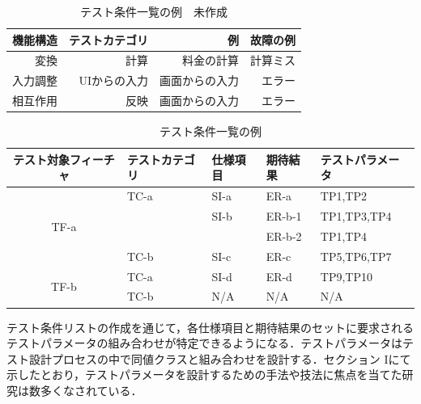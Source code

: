 \documentclass[a4paper,12pt]{jreport}
\begin{document}
\begin{table}[t]
\caption{テスト条件一覧の例　未作成}
\label{tbl:D-3-tbl2}
\begin{center}
\begin{tabular}{r|r|r|r}
機能構造&テストカテゴリ&例&故障の例\\
\hline
\hline
変換&計算&料金の計算&計算ミス\\
\hline
入力調整&UIからの入力&画面からの入力&エラー\\
\hline
相互作用&反映&画面からの入力&エラー\\
    \hline
\end{tabular}%
\end{center}
\end{table}

\begin{table}[htbp]
  \centering
  \caption{テスト条件一覧の例}
    \begin{tabular}{|c|p{6em}|p{6em}|p{6em}|p{7.145em}|}
    \hline
    \multicolumn{1}{|p{8.855em}|}{\textbf{テスト対象フィーチャ}} & \textbf{テストカテゴリ} & \textbf{仕様項目} & \textbf{期待結果} & \textbf{テストパラメータ} \bigstrut \\
    \hline
    \multicolumn{1}{|c|}{\multirow{4}[8]{*}{TF-a}} & TC-a  & SI-a  & ER-a  & TP1,TP2 \bigstrut\\
\cline{2-5}          & \multicolumn{1}{l|}{} & SI-b  & ER-b-1 & TP1,TP3,TP4 \bigstrut\\
\cline{2-5}          & \multicolumn{1}{l|}{} & \multicolumn{1}{l|}{} & ER-b-2 & TP1,TP4 \bigstrut\\
\cline{2-5}          & TC-b  & SI-c  & ER-c  & TP5,TP6,TP7 \bigstrut\\
    \hline
    \multicolumn{1}{|c|}{\multirow{2}[4]{*}{TF-b}} & TC-a  & SI-d  & ER-d  & TP9,TP10 \bigstrut\\
\cline{2-5}          & TC-b  & N/A   & N/A   & N/A \bigstrut\\
    \hline
    \end{tabular}%
  \label{tbl:D-3-tbl3}%
\end{table}%


テスト条件リストの作成を通じて，各仕様項目と期待結果のセットに要求されるテストパラメータの組み合わせが特定できるようになる．テストパラメータはテスト設計プロセスの中で同値クラスと組み合わせを設計する．セクション Iにて示したとおり，テストパラメータを設計するための手法や技法に焦点を当てた研究は数多くなされている．
\end{document}
